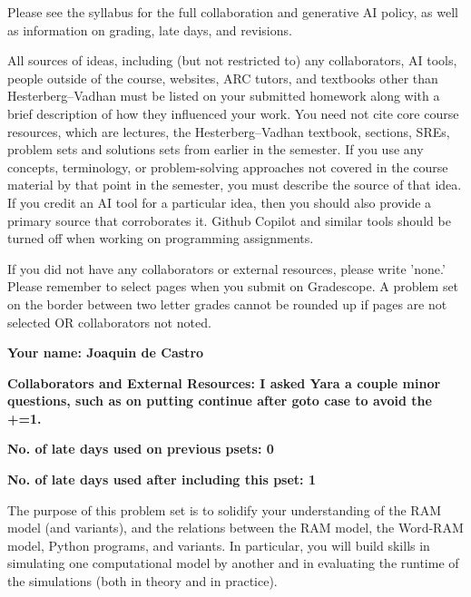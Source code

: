 \documentclass[11pt]{report}
\begin{document}

Please see the syllabus for the full collaboration and generative AI policy, as well as information on grading, late days, and revisions.

All sources of ideas, including (but not restricted to) any collaborators, AI tools, people outside of the course, websites, ARC tutors, and textbooks other than Hesterberg--Vadhan must be listed on your submitted homework along with a brief description of how they influenced your work. You need not cite core course resources, which are lectures, the Hesterberg--Vadhan textbook, sections, SREs, problem sets and solutions sets from earlier in the semester. If you use any concepts, terminology, or problem-solving approaches not covered in the course material by that point in the semester, you must describe the source of that idea. If you credit an AI tool for a particular idea, then you should also provide a primary source that corroborates it. Github Copilot and similar tools should be turned off when working on programming assignments.

If you did not have any collaborators or external resources, please write 'none.' Please remember to select pages when you submit on Gradescope. A problem set on the border between two letter grades cannot be rounded up if pages are not selected OR collaborators not noted.

\textbf{Your name: Joaquin de Castro}

\textbf{Collaborators and External Resources: I asked Yara a couple minor questions, such as on putting continue after goto case to avoid the +=1.}

\textbf{No. of late days used on previous psets: 0}

\textbf{No. of late days used after including this pset: 1}

\vspace{1em}
The purpose of this problem set is to solidify your understanding of the RAM model (and variants), and the relations between the RAM model, the Word-RAM model, Python programs, and variants. In particular, you will build skills in simulating one computational model by another and in evaluating the runtime of the simulations (both in theory and in practice).
\end{document}

